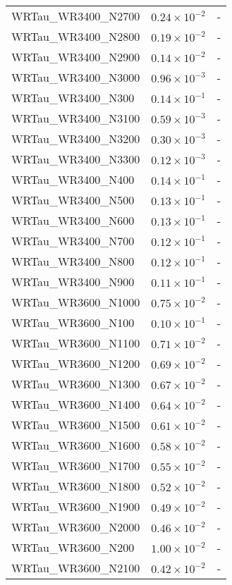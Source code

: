 \begin{longtable}[c]{| C{.35\textwidth} | C{.15\textwidth} | C{.1\textwidth}|}
    WRTau\_WR3400\_N2700 & $0.24\times10^{-2}$ & - \\
    WRTau\_WR3400\_N2800 & $0.19\times10^{-2}$ & - \\
    WRTau\_WR3400\_N2900 & $0.14\times10^{-2}$ & - \\
    WRTau\_WR3400\_N3000 & $0.96\times10^{-3}$ & - \\
    WRTau\_WR3400\_N300 & $0.14\times10^{-1}$ & - \\
    WRTau\_WR3400\_N3100 & $0.59\times10^{-3}$ & - \\
    WRTau\_WR3400\_N3200 & $0.30\times10^{-3}$ & - \\
    WRTau\_WR3400\_N3300 & $0.12\times10^{-3}$ & - \\
    WRTau\_WR3400\_N400 & $0.14\times10^{-1}$ & - \\
    WRTau\_WR3400\_N500 & $0.13\times10^{-1}$ & - \\
    WRTau\_WR3400\_N600 & $0.13\times10^{-1}$ & - \\
    WRTau\_WR3400\_N700 & $0.12\times10^{-1}$ & - \\
    WRTau\_WR3400\_N800 & $0.12\times10^{-1}$ & - \\
    WRTau\_WR3400\_N900 & $0.11\times10^{-1}$ & - \\ \hline
    WRTau\_WR3600\_N1000 & $0.75\times10^{-2}$ & - \\
    WRTau\_WR3600\_N100 & $0.10\times10^{-1}$ & - \\
    WRTau\_WR3600\_N1100 & $0.71\times10^{-2}$ & - \\
    WRTau\_WR3600\_N1200 & $0.69\times10^{-2}$ & - \\
    WRTau\_WR3600\_N1300 & $0.67\times10^{-2}$ & - \\
    WRTau\_WR3600\_N1400 & $0.64\times10^{-2}$ & - \\
    WRTau\_WR3600\_N1500 & $0.61\times10^{-2}$ & - \\
    WRTau\_WR3600\_N1600 & $0.58\times10^{-2}$ & - \\
    WRTau\_WR3600\_N1700 & $0.55\times10^{-2}$ & - \\
    WRTau\_WR3600\_N1800 & $0.52\times10^{-2}$ & - \\
    WRTau\_WR3600\_N1900 & $0.49\times10^{-2}$ & - \\
    WRTau\_WR3600\_N2000 & $0.46\times10^{-2}$ & - \\
    WRTau\_WR3600\_N200 & $1.00\times10^{-2}$ & - \\
    WRTau\_WR3600\_N2100 & $0.42\times10^{-2}$ & - \\

\end{longtable}
